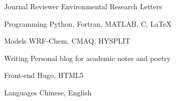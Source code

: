 
\begin{cvskills}

  \cvskill
    {Journal Reviewer} %
    {Environmental Research Letters} %

  \cvskill
    {Programming} %
    {Python, Fortran, MATLAB, C, \LaTeX} %

  \cvskill
    {Models} %
    {WRF-Chem, CMAQ, HYSPLIT} %

  \cvskill
    {Writing} %
    {Personal blog for academic notes and poetry} %

  \cvskill
    {Front-end} %
    {Hugo, HTML5} %

  \cvskill
    {Languages} %
    {Chinese, English} %

\end{cvskills}
